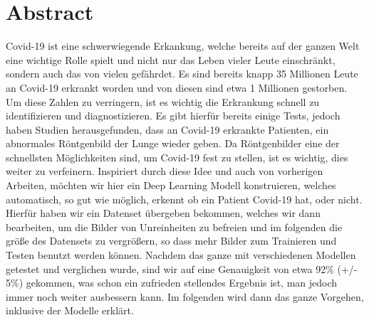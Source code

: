 \chapter{Abstract}
\label{ch:abstract}

Covid-19 ist eine schwerwiegende Erkankung, welche bereits auf der ganzen Welt eine wichtige Rolle spielt und nicht nur das Leben vieler Leute einschränkt, sondern auch das von vielen gefährdet. Es sind bereits knapp 35 Millionen Leute an Covid-19 erkrankt worden und von diesen sind etwa 1 Millionen gestorben. Um diese Zahlen zu verringern, ist es wichtig die Erkrankung schnell zu identifizieren und diagnostizieren. Es gibt hierfür bereits einige Tests, jedoch haben Studien herausgefunden, dass an Covid-19 erkrankte Patienten, ein abnormales Röntgenbild der Lunge wieder geben. Da Röntgenbilder eine der schnellsten Möglichkeiten sind, um Covid-19 fest zu stellen, ist es wichtig, dies weiter zu verfeinern. Inspiriert durch diese Idee und auch von vorherigen Arbeiten, möchten wir hier ein Deep Learning Modell konstruieren, welches automatisch, so gut wie möglich, erkennt ob ein Patient Covid-19 hat, oder nicht. Hierfür haben wir ein Datenset übergeben bekommen, welches wir dann bearbeiten, um die Bilder von Unreinheiten zu befreien und im folgenden die größe des Datensets zu vergrößern, so dass mehr Bilder zum Trainieren und Testen benutzt werden können. Nachdem das ganze mit verschiedenen Modellen getestet und verglichen wurde, sind wir auf eine Genauigkeit von etwa 92\% (+/- 5\%) gekommen, was schon ein zufrieden stellendes Ergebnis ist, man jedoch immer noch weiter ausbessern kann. Im folgenden wird dann das ganze Vorgehen, inklusive der Modelle erklärt.